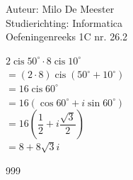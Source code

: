 \documentclass[a4paper]{article}
\begin{document}
  
\noindent \large Auteur: Milo De Meester \\
\noindent \large Studierichting: Informatica\\
\noindent \large Oefeningenreeks 1C nr. 26.2\\

\medskip

\normalsize

$2 \operatorname{cis} 50 ^{\circ} \cdot 8 \operatorname{cis} 10 ^{\circ}$\\

$= (2 \cdot 8) \operatorname{cis} (50 ^{\circ} + 10 ^{\circ})$\\

$= 16 \operatorname{cis} 60 ^{\circ}$\\

$= 16 (\cos 60 ^{\circ} + i \sin 60 ^{\circ})$\\

$= 16\left(\dfrac{1}{2} + i \dfrac{\sqrt{3}}{2}\right)$\\

$= 8 + 8\sqrt{3}i$

\begin{thebibliography}{999}
\end{thebibliography}
\end{document}
